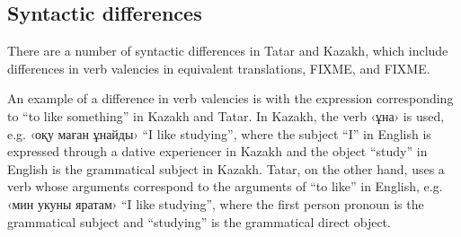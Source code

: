 \documentclass[11pt]{article}
\begin{document}
%

\subsection{Syntactic differences}

There are a number of syntactic differences in Tatar and Kazakh, which include differences in verb valencies in equivalent translations, FIXME, and FIXME.




An example of a difference in verb valencies is with the expression corresponding to ``to like something'' in Kazakh and Tatar.  In Kazakh, the verb ‹ұна› is used, e.g. ‹оқу маған ұнайды› ``I like studying'', where the subject ``I'' in English is expressed through a dative experiencer in Kazakh and the object ``study'' in English is the grammatical subject in Kazakh.  Tatar, on the other hand, uses a verb whose arguments correspond to the arguments of ``to like'' in English, e.g. ‹мин укуны яратам› ``I like studying'', where the first person pronoun is the grammatical subject and ``studying'' is the grammatical direct object.
\end{document}
